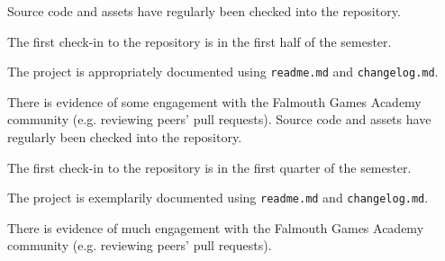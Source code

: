 \documentclass{../fal_assignment}
\begin{document}
\begin{markingrubric}
        \grade 		Source code and assets have regularly been checked into the repository.
        \par  		The first check-in to the repository is in the first half of the semester.
        \par 		The project is appropriately documented using \texttt{readme.md} and \texttt{changelog.md}.
        \par 		There is evidence of some engagement with the Falmouth Games Academy community (e.g. reviewing peers' pull requests).
        \grade 		Source code and assets have regularly been checked into the repository.
        \par  		The first check-in to the repository is in the first quarter of the semester.
        \par 		The project is exemplarily documented using \texttt{readme.md} and \texttt{changelog.md}.
        \par 		There is evidence of much engagement with the Falmouth Games Academy community (e.g. reviewing peers' pull requests).
\end{markingrubric}
\end{document}
